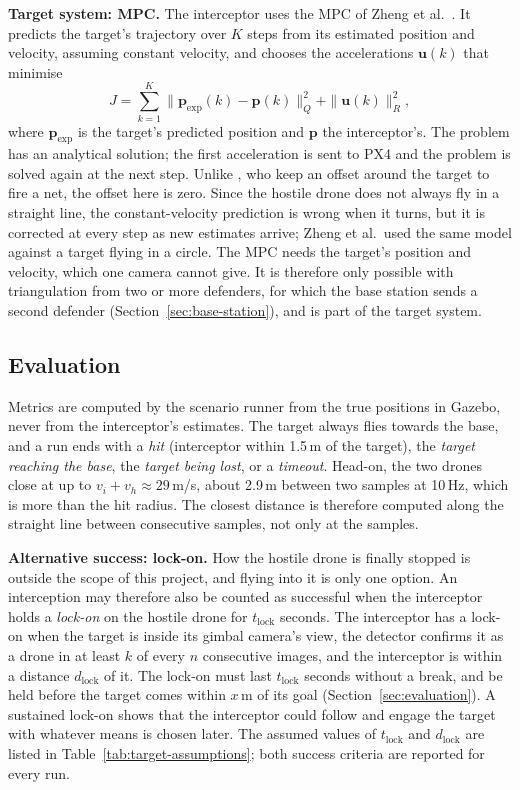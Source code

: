 \textbf{Target system: MPC.} The interceptor uses the MPC of Zheng et al.\
\cite{zheng2025mcm}. It predicts the target's trajectory over $K$ steps from
its estimated position and velocity, assuming constant velocity, and chooses
the accelerations $\mathbf{u}(k)$ that minimise
\begin{equation}
  J = \sum_{k=1}^{K} \|\mathbf{p}_{\mathrm{exp}}(k) - \mathbf{p}(k)\|^2_{Q}
      + \|\mathbf{u}(k)\|^2_{R},
\end{equation}
where $\mathbf{p}_{\mathrm{exp}}$ is the target's predicted position and
$\mathbf{p}$ the interceptor's. The problem has an analytical solution; the
first acceleration is sent to PX4 and the problem is solved again at the next
step. Unlike \cite{zheng2025mcm}, who keep an offset around the target to fire
a net, the offset here is zero. Since the hostile drone does not always fly
in a straight line, the constant-velocity prediction is wrong when it turns,
but it is corrected at every step as new estimates arrive; Zheng et al.\
used the same model against a target flying in a circle. The MPC needs the
target's position and velocity, which one camera cannot give. It is therefore
only possible with triangulation from two or more defenders, for which the
base station sends a second defender (Section~\ref{sec:base-station}), and is part of
the target system.

\subsection{Evaluation}
Metrics are computed by the scenario runner from the true positions in
Gazebo, never from the interceptor's estimates. The target always flies
towards the base, and a run ends with a \emph{hit} (interceptor within
1.5\,m of the target), the \emph{target reaching the base}, the \emph{target
being lost}, or a \emph{timeout}. Head-on, the two drones close at up to
$v_i + v_h \approx 29$\,m/s, about 2.9\,m between two samples at 10\,Hz, which
is more than the hit radius. The closest distance is therefore computed along
the straight line between consecutive samples, not only at the samples.

\textbf{Alternative success: lock-on.} How the hostile drone is finally
stopped is outside the scope of this project, and flying into it is only one
option. An interception may therefore also be counted as successful when the
interceptor holds a \emph{lock-on} on the hostile drone for $t_{\mathrm{lock}}$
seconds. The interceptor has a lock-on when the target is inside its gimbal
camera's view, the detector confirms it as a drone in at least $k$ of every
$n$ consecutive images, and the interceptor is within a distance
$d_{\mathrm{lock}}$ of it. The lock-on must last $t_{\mathrm{lock}}$ seconds
without a break, and be held before the target comes within $x$\,m of its
goal (Section~\ref{sec:evaluation}). A sustained lock-on shows that the
interceptor could follow and engage the target with whatever means is chosen
later. The assumed values of $t_{\mathrm{lock}}$ and $d_{\mathrm{lock}}$ are
listed in Table~\ref{tab:target-assumptions}; both success criteria are
reported for every run.


